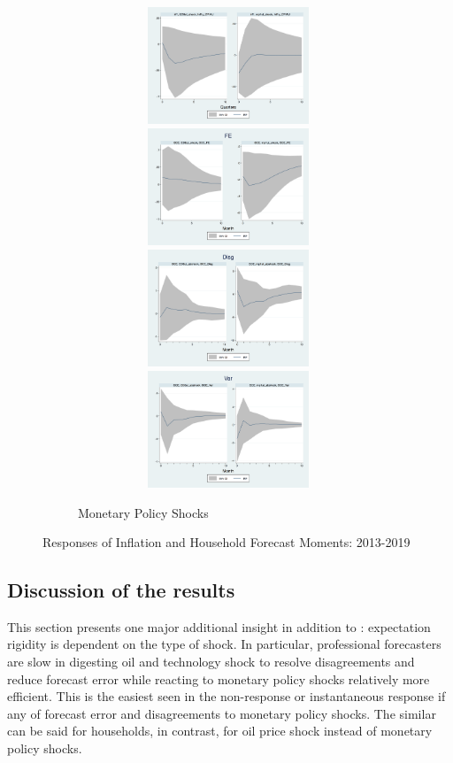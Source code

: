 \documentclass[12pt]{article}
\begin{document}
\begin{figure}[ht]
\begin{subfigure}[b]{0.65\textwidth}
			\caption{Monetary Policy Shocks}
			\includegraphics[width=9cm,height=3.5cm]{figures/CPIAU_ashocksM.png} 
			\smallskip
			\includegraphics[width=9cm,height=3.5cm]{figures/SCEFE_ashocksM.png} 
			\smallskip
			\includegraphics[width=9cm,height=3.5cm]{figures/SCEDisg_ab_ashocksM.png} 
			\smallskip 
			\includegraphics[width=9cm,height=3.5cm]{figures/SCEVar_ab_ashocksM.png} 
		\end{subfigure}
		\caption{ Responses of Inflation and Household Forecast Moments: 2013-2019}
		\label{SCE_IR}
	\end{figure}
		
	\subsection{Discussion of the results}
	
	This section presents one major additional insight in addition to \cite{coibion2012can}: expectation rigidity is dependent on the type of shock. In particular, professional forecasters are slow in digesting oil and technology shock to resolve disagreements and reduce forecast error while reacting to monetary policy shocks relatively more efficient. This is the easiest seen in the non-response or instantaneous response if any of forecast error and disagreements to monetary policy shocks. The similar can be said for households, in contrast, for oil price shock instead of monetary policy shocks.
	
\end{document}
